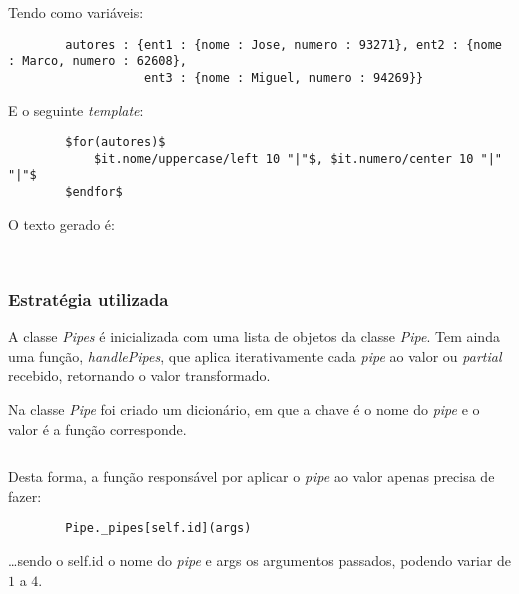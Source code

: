\documentclass[../relatorio.tex]{subfiles}
\begin{document}
    Tendo como variáveis:
    \begin{verbatim}
        autores : {ent1 : {nome : Jose, numero : 93271}, ent2 : {nome : Marco, numero : 62608},
                   ent3 : {nome : Miguel, numero : 94269}}
    \end{verbatim}
    E o seguinte \textit{template}:
    \begin{verbatim}
        $for(autores)$
            $it.nome/uppercase/left 10 "|"$, $it.numero/center 10 "|" "|"$
        $endfor$
    \end{verbatim}
    O texto gerado é:
    \begin{verbatim}
        
    \end{verbatim}

    \subsubsection{Estratégia utilizada}

    A classe \textit{Pipes} é inicializada com uma lista de objetos da classe 
    \textit{Pipe}. Tem ainda uma função, \textit{handlePipes}, que aplica iterativamente
    cada \textit{pipe} ao valor ou \textit{partial} recebido, retornando o valor transformado.

    Na classe \textit{Pipe} foi criado um dicionário, em que a chave é o nome do \textit{pipe} 
    e o valor é a função corresponde. 
    
    \inputminted[firstline=168, lastline=185]{py}{../modules/Pipe.py}
    
    Desta forma, a função responsável por aplicar o \textit{pipe} ao valor apenas precisa
    de fazer:
    \begin{verbatim}
        Pipe._pipes[self.id](args)
    \end{verbatim}
    \dots sendo o self.id o nome do \textit{pipe} e args os argumentos passados, podendo variar de
    $1$ a $4$.
\end{document}
